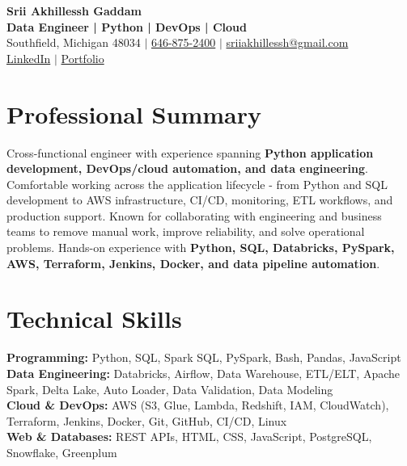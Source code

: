 \documentclass[letterpaper,10pt]{article}
\begin{document}
\fontsize{9.35pt}{10.45pt}\selectfont

\begin{center}
    {\LARGE \textbf{Srii Akhillessh Gaddam}} \\[-1pt]
    \textbf{Data Engineer | Python | DevOps | Cloud} \\[2pt]
    Southfield, Michigan 48034 $|$
    \href{tel:6468752400}{646-875-2400} $|$
    \href{mailto:sriiakhillessh@gmail.com}{sriiakhillessh@gmail.com} \\[1pt]
    \href{https://www.linkedin.com/in/srii-akhiilessh-gaddam-b48668191/}{LinkedIn} $|$
    \href{https://sriiakhillesshg.github.io/portfolio/}{Portfolio}
\end{center}
\vspace{-8pt}

\section{Professional Summary}
\small{Cross-functional engineer with experience spanning \textbf{Python application development, DevOps/cloud automation, and data engineering}. Comfortable working across the application lifecycle - from Python and SQL development to AWS infrastructure, CI/CD, monitoring, ETL workflows, and production support. Known for collaborating with engineering and business teams to remove manual work, improve reliability, and solve operational problems. Hands-on experience with \textbf{Python, SQL, Databricks, PySpark, AWS, Terraform, Jenkins, Docker, and data pipeline automation}.}

\section{Technical Skills}
\small{
\textbf{Programming:} Python, SQL, Spark SQL, PySpark, Bash, Pandas, JavaScript \\
\textbf{Data Engineering:} Databricks, Airflow, Data Warehouse, ETL/ELT, Apache Spark, Delta Lake, Auto Loader, Data Validation, Data Modeling \\
\textbf{Cloud \& DevOps:} AWS (S3, Glue, Lambda, Redshift, IAM, CloudWatch), Terraform, Jenkins, Docker, Git, GitHub, CI/CD, Linux \\
\textbf{Web \& Databases:} REST APIs, HTML, CSS, JavaScript, PostgreSQL, Snowflake, Greenplum
}
\end{document}
